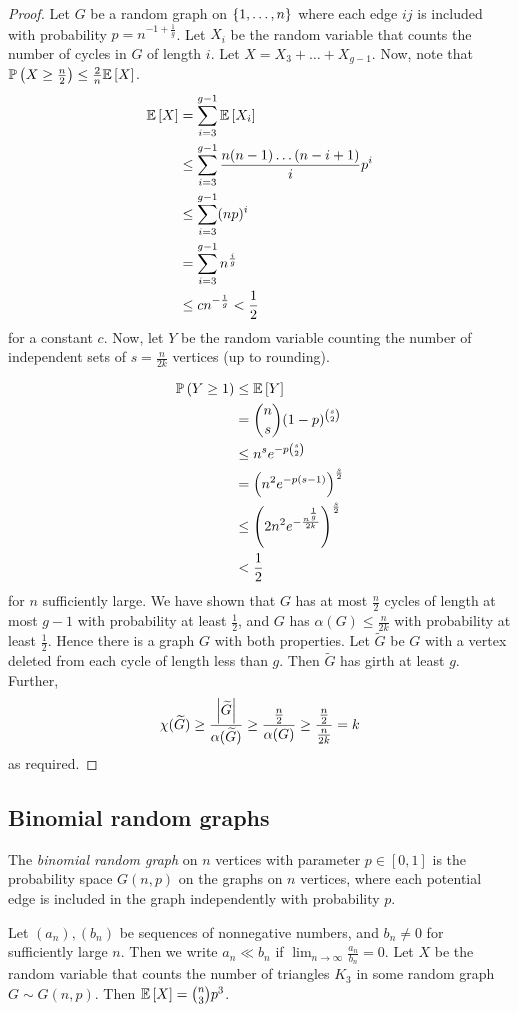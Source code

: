 \begin{proof}
	Let \( G \) be a random graph on \( \qty{1, \dots, n} \) where each edge \( ij \) is included with probability \( p = n^{-1 + \frac{1}{g}} \).
	Let \( X_i \) be the random variable that counts the number of cycles in \( G \) of length \( i \).
	Let \( X = X_3 + \dots + X_{g-1} \).
	Now, note that \( \mathbb{P}\left({X \geq \frac{n}{2}}\right) \leq \frac{2}{n} \mathbb{E}\left[{X}\right] \).
	\begin{align*}
		\mathbb{E}\left[{X}\right] &= \sum_{i=3}^{g-1} \mathbb{E}\left[{X_i}\right] \\
		&\leq \sum_{i=3}^{g-1} \frac{n(n-1) \dots (n-i+1)}{i} p^i \\
		&\leq \sum_{i=3}^{g-1} (np)^i \\
		&= \sum_{i=3}^{g-1} n^{\frac{i}{g}} \\
		&\leq c n^{-\frac{1}{g}} < \frac{1}{2}
	\end{align*}
	for a constant \( c \).
	Now, let \( Y \) be the random variable counting the number of independent sets of \( s = \frac{n}{2k} \) vertices (up to rounding).

	\begin{align*}
		\mathbb{P}\left({Y \geq 1}\right) &\leq \mathbb{E}\left[{Y}\right] \\
		&= \binom n s (1-p)^{\binom s 2} \\
		&\leq n^s e^{-p\binom s 2} \\
		&= \qty(n^2 e^{-p(s-1)})^{\frac{s}{2}} \\
		&\leq \qty(2n^2 e^{-\frac{n^{\frac 1 g}}{2k}})^{\frac{s}{2}} \\
		&< \frac{1}{2}
	\end{align*}
	for \( n \) sufficiently large.
	We have shown that \( G \) has at most \( \frac{n}{2} \) cycles of length at most \( g - 1 \) with probability at least \( \frac{1}{2} \), and \( G \) has \( \alpha(G) \leq \frac{n}{2k} \) with probability at least \( \frac{1}{2} \).
	Hence there is a graph \( G \) with both properties.
	Let \( \widetilde G \) be \( G \) with a vertex deleted from each cycle of length less than \( g \).
	Then \( \widetilde G \) has girth at least \( g \).
	Further,
	\[ \chi(\widetilde G) \geq \frac{\abs{\widetilde G}}{\alpha(\widetilde G)} \geq \frac{\frac{n}{2}}{\alpha(G)} \geq \frac{\frac{n}{2}}{\frac{n}{2k}} = k \]
	as required.
\end{proof}

\subsection{Binomial random graphs}
\begin{definition}
	The \emph{binomial random graph} on \( n \) vertices with parameter \( p \in [0,1] \) is the probability space \( G(n,p) \) on the graphs on \( n \) vertices, where each potential edge is included in the graph independently with probability \( p \).
\end{definition}
Let \( (a_n), (b_n) \) be sequences of nonnegative numbers, and \( b_n \neq 0 \) for sufficiently large \( n \).
Then we write \( a_n \ll b_n \) if \( \lim_{n \to \infty} \frac{a_n}{b_n} = 0 \).
Let \( X \) be the random variable that counts the number of triangles \( K_3 \) in some random graph \( G \sim G(n,p) \).
Then \( \mathbb{E}\left[{X}\right] = \binom n 3 p^3 \).

